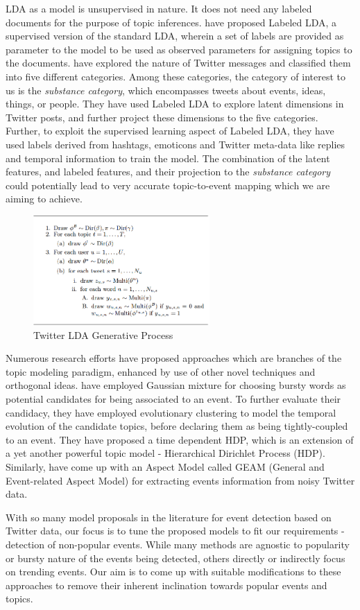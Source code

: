 LDA as a model is unsupervised in nature. It does not need any labeled documents for the purpose of topic inferences. \cite{ramage2009labeled} have proposed Labeled LDA, a supervised version of the standard LDA, wherein a set of labels are provided as parameter to the model to be used as observed parameters for assigning topics to the documents. \cite{ramage2010characterizing} have explored the nature of Twitter messages and classified them into five different categories. Among these categories, the category of interest to us is the \emph{substance category}, which encompasses tweets about events, ideas, things, or people. They have used Labeled LDA to explore latent dimensions in Twitter posts, and further project these dimensions to the five categories. Further, to exploit the supervised learning aspect of Labeled LDA, they have used labels derived from hashtags, emoticons and Twitter meta-data like replies and temporal information to train the model. The combination of the latent features, and labeled features, and their projection to the \emph{substance category} could potentially lead to very accurate topic-to-event mapping which we are aiming to achieve.

 \begin{figure}
 \centering
 \includegraphics[width=0.6\textwidth]{figures/lda-algo}
 \caption{Twitter LDA Generative Process}
 \label{fig:twitterlda-algo}
\end{figure}

Numerous research efforts have proposed approaches which are branches of the topic modeling paradigm, enhanced by use of other novel techniques and orthogonal ideas. \cite{wang2013real} have employed Gaussian mixture for choosing bursty words as potential candidates for being associated to an event. To further evaluate their candidacy, they have employed evolutionary clustering to model the temporal evolution of the candidate topics, before declaring them as being tightly-coupled to an event. They have proposed a time dependent HDP, which is an extension of a yet another powerful topic model - Hierarchical Dirichlet Process (HDP). Similarly, \cite{you2013geam} have come up with an Aspect Model called GEAM (General and Event-related Aspect Model) for extracting events information from noisy Twitter data.

With so many model proposals in the literature for event detection based on Twitter data, our focus is to tune the proposed models to fit our requirements - detection of non-popular events. While many methods are agnostic to popularity or bursty nature of the events being detected, others directly or indirectly focus on trending events. Our aim is to come up with suitable modifications to these approaches to remove their inherent inclination towards popular events and topics.

